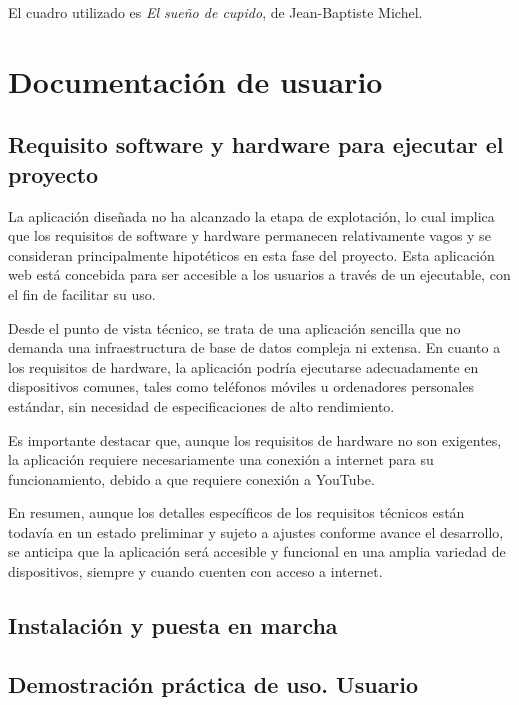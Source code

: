 \documentclass[a4paper,12pt,twoside]{memoir}
\newcommand{\apendice}[1]{
	\chapter{#1}
}
\begin{document}
El cuadro utilizado es \textit{El sueño de cupido}, de Jean-Baptiste Michel.

\apendice{Documentación de usuario}
 \section{Requisito software y hardware para ejecutar el proyecto}
 La aplicación diseñada no ha alcanzado la etapa de explotación, lo cual implica que los requisitos de software y hardware permanecen relativamente vagos y se consideran principalmente hipotéticos en esta fase del proyecto. Esta aplicación web está concebida para ser accesible a los usuarios a través de un ejecutable, con el fin de facilitar su uso. 

Desde el punto de vista técnico, se trata de una aplicación sencilla que no demanda una infraestructura de base de datos compleja ni extensa. En cuanto a los requisitos de hardware, la aplicación podría ejecutarse adecuadamente en dispositivos comunes, tales como teléfonos móviles u ordenadores personales estándar, sin necesidad de especificaciones de alto rendimiento. 

Es importante destacar que, aunque los requisitos de hardware no son exigentes, la aplicación requiere necesariamente una conexión a internet para su funcionamiento, debido a que requiere conexión a YouTube. 

En resumen, aunque los detalles específicos de los requisitos técnicos están todavía en un estado preliminar y sujeto a ajustes conforme avance el desarrollo, se anticipa que la aplicación será accesible y funcional en una amplia variedad de dispositivos, siempre y cuando cuenten con acceso a internet.
 \section{Instalación y puesta en marcha}
 \section{Demostración práctica de uso. Usuario}
\end{document}
